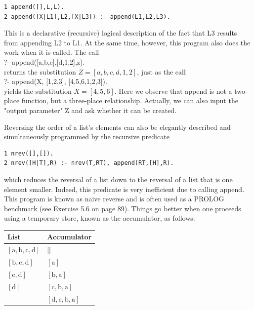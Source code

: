 \documentclass[10pt]{article}
\begin{document}
\begin{verbatim}
1 append([],L,L).
2 append([X|L1],L2,[X|L3]) :- append(L1,L2,L3).
\end{verbatim}

This is a declarative (recursive) logical description of the fact that L3 results from appending L2 to L1. At the same time, however, this program also does the work when it is called. The call\\[0pt]
?- append([a,b,c],[d,1,2],z).\\
returns the substitution $Z=[a, b, c, d, 1,2]$, just as the call\\[0pt]
?- append(X, [1,2,3], [4,5,6,1,2,3]).\\
yields the substitution $X=[4,5,6]$. Here we observe that append is not a two-place function, but a three-place relationship. Actually, we can also input the "output parameter" Z and ask whether it can be created.

Reversing the order of a list's elements can also be elegantly described and simultaneously programmed by the recursive predicate

\begin{verbatim}
1 nrev([],[]).
2 nrev([H|T],R) :- nrev(T,RT), append(RT,[H],R).
\end{verbatim}

which reduces the reversal of a list down to the reversal of a list that is one element smaller. Indeed, this predicate is very inefficient due to calling append. This program is known as naive reverse and is often used as a PROLOG benchmark (see Exercise 5.6 on page 89). Things go better when one proceeds using a temporary store, known as the accumulator, as follows:

\begin{center}
\begin{tabular}{ll}
\hline
List & Accumulator \\
\hline
$[\mathrm{a}, \mathrm{b}, \mathrm{c}, \mathrm{d}]$ & [] \\
\hline
$[\mathrm{b}, \mathrm{c}, \mathrm{d}]$ & $[\mathrm{a}]$ \\
\hline
$[\mathrm{c}, \mathrm{d}]$ & $[\mathrm{b}, \mathrm{a}]$ \\
\hline
$[\mathrm{d}]$ & $[\mathrm{c}, \mathrm{b}, \mathrm{a}]$ \\
\hline
[] & $[\mathrm{d}, \mathrm{c}, \mathrm{b}, \mathrm{a}]$ \\
\hline
\end{tabular}
\end{center}
\end{document}
